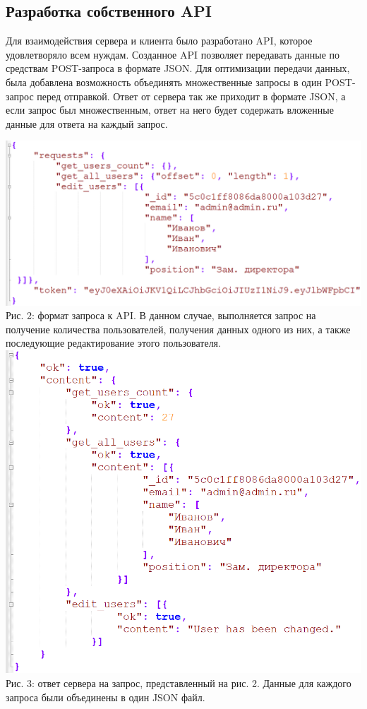 \documentclass[14pt,a4paper,openbib]{extarticle}
\numberwithin{equation}{section}
\begin{document}
\subsection{Разработка собственного API}
Для взаимодействия сервера и клиента было разработано API, которое удовлетворяло всем нуждам. Созданное API позволяет передавать данные по средствам POST-запроса в формате JSON. Для оптимизации передачи данных, была добавлена возможность объединять множественные запросы в один POST-запрос перед отправкой. Ответ от сервера так же приходит в формате JSON, а если запрос был множественным, ответ на него будет содержать вложенные данные для ответа на каждый запрос.
\begin{center}
\includegraphics[width=\textwidth]{img/req.png}\\
Рис. 2: формат запроса к API. В данном случае, выполняется запрос на получение количества пользователей, получения данных одного из них, а также последующие редактирование этого пользователя.\\[\baselineskip]
\includegraphics[scale=0.5]{img/ans.png}\\
Рис. 3: ответ сервера на запрос, представленный на рис. 2. Данные для каждого запроса были объединены в один JSON файл.\\[\baselineskip]
\end{center}
\end{document}
